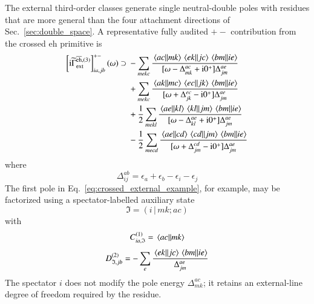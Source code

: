 \documentclass[aip,jcp,reprint,noshowkeys,superscriptaddress]{revtex4-1}
\newcommand{\eps}{\epsilon}
\newcommand{\ii}{\mathrm{i}}
\newcommand{\eh}{\text{eh}}
\newcommand{\teh}{\overline{\text{eh}}}
\begin{document}
The external third-order classes generate single neutral-double poles with residues that are more general than the four attachment directions of Sec.~\ref{sec:double_space}.
A representative fully audited $+-$ contribution from the crossed $\eh$ primitive is
\begin{equation}
	\begin{split}
	\left[
	\ii\widetilde\Gamma^{\teh,(3)}_{\rm ext}
	\right]^{+-}_{ia,jb}(\omega)
	\supset{}&
	-
	\sum_{mekc}
	\frac{
	\mel{ac}{}{mk}
	\mel{ek}{}{jc}
	\mel{bm}{}{ie}
	}{
	[\omega-\Delta_{mk}^{ac}+\ii0^+]
	\Delta_{jm}^{ae}
	}
	\\
	&+
	\sum_{mekc}
	\frac{
	\mel{ak}{}{mc}
	\mel{ec}{}{jk}
	\mel{bm}{}{ie}
	}{
	[\omega+\Delta_{jk}^{ec}-\ii0^+]
	\Delta_{jm}^{ae}
	}
	\\
	&+
	\frac{1}{2}
	\sum_{mekl}
	\frac{
	\mel{ae}{}{kl}
	\mel{kl}{}{jm}
	\mel{bm}{}{ie}
	}{
	[\omega-\Delta_{kl}^{ae}+\ii0^+]
	\Delta_{jm}^{ae}
	}
	\\
	&-
	\frac{1}{2}
	\sum_{mecd}
	\frac{
	\mel{ae}{}{cd}
	\mel{cd}{}{jm}
	\mel{bm}{}{ie}
	}{
	[\omega+\Delta_{jm}^{cd}-\ii0^+]
	\Delta_{jm}^{ae}
	}
	\end{split}
	\label{eq:crossed_external_example}
\end{equation}
where
\begin{equation}
	\Delta_{ij}^{ab}
	=
	\eps_a+\eps_b-\eps_i-\eps_j
	\label{eq:Delta_general}
\end{equation}
The first pole in Eq.~\eqref{eq:crossed_external_example}, for example, may be factorized using a spectator-labelled auxiliary state
\begin{equation}
	\mathfrak I
	=
	(i\,|\,mk;ac)
	\label{eq:spectator_example}
\end{equation}
with
\begin{equation}
	C^{(1)}_{ia,\mathfrak I}
	=
	\mel{ac}{}{mk}
	\label{eq:spectator_C}
\end{equation}
\begin{equation}
	D^{(2)}_{\mathfrak I,jb}
	=
	-
	\sum_e
	\frac{
	\mel{ek}{}{jc}
	\mel{bm}{}{ie}
	}{
	\Delta_{jm}^{ae}
	}
	\label{eq:spectator_D}
\end{equation}
The spectator $i$ does not modify the pole energy $\Delta_{mk}^{ac}$; it retains an external-line degree of freedom required by the residue.
\end{document}
